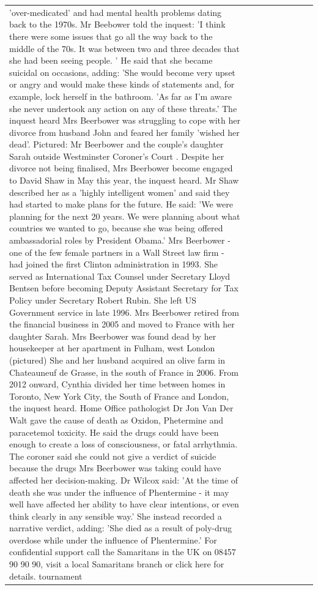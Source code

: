 \begin{table}[H]
\begin{tabular}{lllrlllll}
'over-medicated' and had mental health problems dating back to the 1970s. Mr Beebower told the inquest: 'I think there were some issues that go all the way back to the middle of the 70s. It was between two and three decades that she had been seeing people. ' He said that she became suicidal on occasions, adding: 'She would become very upset or angry and would make these kinds of statements and, for example, lock herself in the bathroom. 'As far as I'm aware she never undertook any action on any of these threats.' The inquest heard Mrs Beerbower was struggling to cope with her divorce from husband John and feared her family 'wished her dead'. Pictured: Mr Beerbower and the couple's daughter Sarah outside Westminster Coroner's Court . Despite her divorce not being finalised, Mrs Beerbower become engaged to David Shaw in May this year, the inquest heard. Mr Shaw described her as a 'highly intelligent women' and said they had started to make plans for the future. He said: 'We were planning for the next 20 years. We were planning about what countries we wanted to go, because she was being offered ambassadorial roles by President Obama.' Mrs Beerbower - one of the few female partners in a Wall Street law firm - had joined the first Clinton administration in 1993. She served as International Tax Counsel under Secretary Lloyd Bentsen before becoming Deputy Assistant Secretary for Tax Policy under Secretary Robert Rubin. She left US Government service in late 1996. Mrs Beerbower retired from the financial business in 2005 and moved to France with her daughter Sarah. Mrs Beerbower was found dead by her housekeeper at her apartment in Fulham, west London (pictured) She and her husband acquired an olive farm in Chateauneuf de Grasse, in the south of France in 2006. From 2012 onward, Cynthia divided her time between homes in Toronto, New York City, the South of France and London, the inquest heard. Home Office pathologist Dr Jon Van Der Walt gave the cause of death as Oxidon, Phetermine and paracetemol toxicity. He said the drugs could have been enough to create a loss of consciousness, or fatal arrhythmia. The coroner said she could not give a verdict of suicide because the drugs Mrs Beerbower was taking could have affected her decision-making. Dr Wilcox said: 'At the time of death she was under the influence of Phentermine - it may well have affected her ability to have clear intentions, or even think clearly in any sensible way.' She instead recorded a narrative verdict, adding: 'She died as a result of poly-drug overdose while under the influence of Phentermine.' For confidential support call the Samaritans in the UK on 08457 90 90 90, visit a local Samaritans branch or click here for details. tournament \\

\end{tabular}
\end{table}
